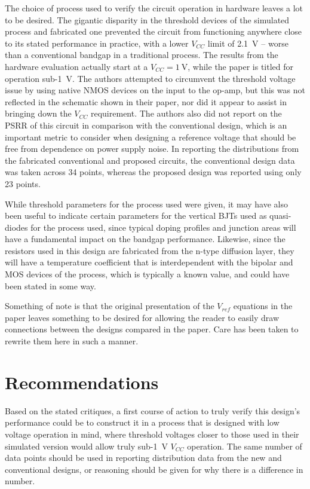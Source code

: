 \documentclass[journal]{IEEEtran}
\begin{document}
The choice of process used to verify the circuit operation in hardware leaves a lot to be desired. The gigantic disparity in the threshold devices of the simulated process and fabricated one prevented the circuit from functioning anywhere close to its stated performance in practice, with a lower \(V_{CC}\) limit of \qty{2.1}{\V} -- worse than a conventional bandgap in a traditional process. The results from the hardware evaluation actually start at a \(V_{CC} = \qty{1}{\V}\), while the paper is titled for operation sub-\qty{1}{\V}. The authors attempted to circumvent the threshold voltage issue by using native NMOS devices on the input to the op-amp, but this was not reflected in the schematic shown in their paper, nor did it appear to assist in bringing down the \(V_{CC}\) requirement. The authors also did not report on the PSRR of this circuit in comparison with the conventional design, which is an important metric to consider when designing a reference voltage that should be free from dependence on power supply noise. In reporting the distributions from the fabricated conventional and proposed circuits, the conventional design data was taken across 34 points, whereas the proposed design was reported using only 23 points.

While threshold parameters for the process used were given, it may have also been useful to indicate certain parameters for the vertical BJTs used as quasi-diodes for the process used, since typical doping profiles and junction areas will have a fundamental impact on the bandgap performance. Likewise, since the resistors used in this design are fabricated from the n-type diffusion layer, they will have a temperature coefficient that is interdependent with the bipolar and MOS devices of the process, which is typically a known value, and could have been stated in some way.

Something of note is that the original presentation of the \(V_{ref}\) equations in the paper leaves something to be desired for allowing the reader to easily draw connections between the designs compared in the paper. Care has been taken to rewrite them here in such a manner.

\section{Recommendations}

Based on the stated critiques, a first course of action to truly verify this design's performance could be to construct it in a process that is designed with low voltage operation in mind, where threshold voltages closer to those used in their simulated version would allow truly sub-\qty{1}{\V} \(V_{CC}\) operation. The same number of data points should be used in reporting distribution data from the new and conventional designs, or reasoning should be given for why there is a difference in number. 
\end{document}
